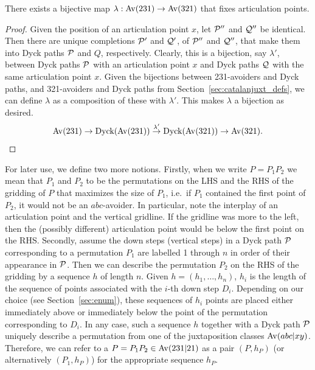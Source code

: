 \begin{lemma}
\label{lem:simplebijection}
There exists a bijective map $\lambda: \Av(231) \to \Av(321)$ that fixes articulation points.
\end{lemma}
\begin{proof}
Given the position of an articulation point $x$, let $\P''$ and $\Q''$ be identical. Then there are unique completions $\P'$ and $\Q'$, of $\P''$ and $\Q''$, that make them into Dyck paths $\P$ and $Q$, respectively. Clearly, this is a bijection, say $\lambda'$, between Dyck paths $\P$ with an articulation point $x$ and Dyck paths $\Q$ with the same articulation point $x$. Given the bijections between 231-avoiders and Dyck paths, and 321-avoiders and Dyck paths from Section~\ref{sec:catalanjuxt_defs}, we can define $\lambda$ as a composition of these with $\lambda'$. This makes $\lambda$ a bijection as desired.
\begin{align*}
\Av(231) \to \text{Dyck}(\Av(231)) \overset{\lambda'}{\to} \text{Dyck}(\Av(321))\to \Av(321).
\end{align*}
\end{proof}

For later use, we define two more notions. Firstly, when we write $P = P_1P_2$ we mean that $P_1$ and $P_2$ to be the permutations on the LHS and the RHS of the gridding of $P$ that maximizes the size of $P_1$, i.e.~if $P_1$ contained the first point of $P_2$, it would not be an $abc$-avoider. In particular, note the interplay of an articulation point and the vertical gridline. If the gridline was more to the left, then the (possibly different) articulation point would be below the first point on the RHS. Secondly, assume the down steps (vertical steps) in a Dyck path $\P$ corresponding to a permutation $P_1$ are labelled 1 through $n$ in order of their appearance in $\P$. Then we can describe the permutation $P_2$ on the RHS of the gridding by a sequence $h$ of length $n$. Given $h = (h_1,\ldots,h_n)$, $h_i$ is the length of the sequence of points associated with the $i$-th down step $D_i$. Depending on our choice (see Section~\ref{sec:enum}), these sequences of $h_i$ points are placed either immediately above or immediately below the point of the permutation corresponding to $D_i$. In any case, such a sequence $h$ together with a Dyck path $\P$ uniquely describe a permutation from one of the juxtaposition classes $\Av(abc|xy)$. Therefore, we can refer to a $P = P_1P_2 \in \Av(231|21)$ as a pair $(P,h_P)$ (or alternatively $(P_1,h_P)$) for the appropriate sequence $h_P$.

